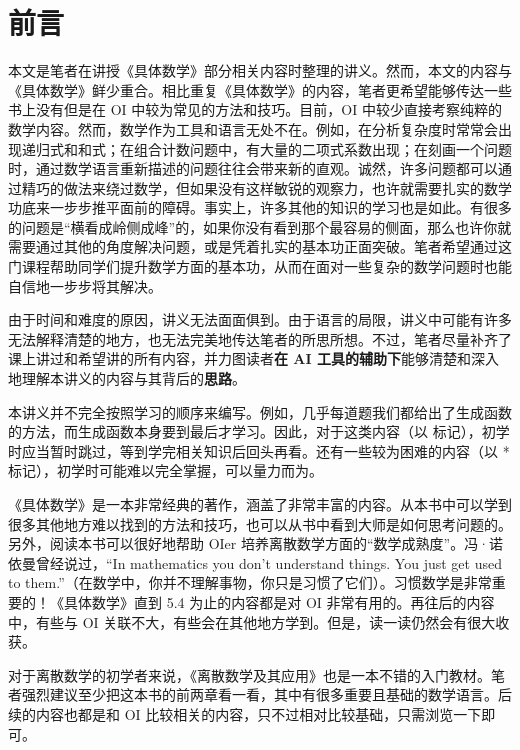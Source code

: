 
\chapter*{前言}
    
本文是笔者在讲授《具体数学》部分相关内容时整理的讲义。然而，本文的内容与《具体数学》鲜少重合。相比重复《具体数学》的内容，笔者更希望能够传达一些书上没有但是在 OI 中较为常见的方法和技巧。目前，OI 中较少直接考察纯粹的数学内容。然而，数学作为工具和语言无处不在。例如，在分析复杂度时常常会出现递归式和和式；在组合计数问题中，有大量的二项式系数出现；在刻画一个问题时，通过数学语言重新描述的问题往往会带来新的直观。诚然，许多问题都可以通过精巧的做法来绕过数学，但如果没有这样敏锐的观察力，也许就需要扎实的数学功底来一步步推平面前的障碍。事实上，许多其他的知识的学习也是如此。有很多的问题是“横看成岭侧成峰”的，如果你没有看到那个最容易的侧面，那么也许你就需要通过其他的角度解决问题，或是凭着扎实的基本功正面突破。笔者希望通过这门课程帮助同学们提升数学方面的基本功，从而在面对一些复杂的数学问题时也能自信地一步步将其解决。

由于时间和难度的原因，讲义无法面面俱到。由于语言的局限，讲义中可能有许多无法解释清楚的地方，也无法完美地传达笔者的所思所想。不过，笔者尽量补齐了课上讲过和希望讲的所有内容，并力图读者\textbf{在 AI 工具的辅助下}能够清楚和深入地理解本讲义的内容与其背后的\textbf{思路}。

本讲义并不完全按照学习的顺序来编写。例如，几乎每道题我们都给出了生成函数的方法，而生成函数本身要到最后才学习。因此，对于这类内容（以 \pending 标记），初学时应当暂时跳过，等到学完相关知识后回头再看。还有一些较为困难的内容（以 * 标记），初学时可能难以完全掌握，可以量力而为。

《具体数学》是一本非常经典的著作，涵盖了非常丰富的内容。从本书中可以学到很多其他地方难以找到的方法和技巧，也可以从书中看到大师是如何思考问题的。另外，阅读本书可以很好地帮助 OIer 培养离散数学方面的“数学成熟度”。冯·诺依曼曾经说过，“In mathematics you don't understand things. You just get used to them.”（在数学中，你并不理解事物，你只是习惯了它们）。习惯数学是非常重要的！《具体数学》直到 5.4 为止的内容都是对 OI 非常有用的。再往后的内容中，有些与 OI 关联不大，有些会在其他地方学到。但是，读一读仍然会有很大收获。

对于离散数学的初学者来说，《离散数学及其应用》也是一本不错的入门教材。笔者强烈建议至少把这本书的前两章看一看，其中有很多重要且基础的数学语言。后续的内容也都是和 OI 比较相关的内容，只不过相对比较基础，只需浏览一下即可。

